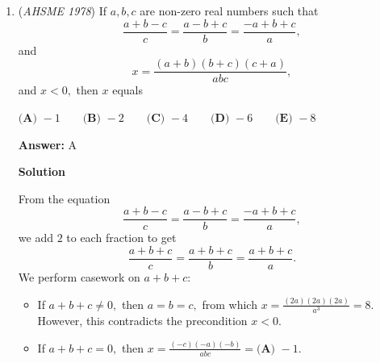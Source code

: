 \begin{enumerate}
 $\textbf{(A) }.05\qquad \textbf{(B) }.065\qquad \textbf{(C) }.08\qquad \textbf{(D) }.09\qquad  \textbf{(E) }.1$

 \textbf{Answer: }C



\textbf{Solution}

Let's say that we will have $3$ slips for every number not exceeding $100$ but bigger than $50.$ This is to account for the $3p$ probability part. Let's now say that we will only have one slip for each number below or equal to $50.$ The probability(or $p$) will then be $\frac{1}{200}.$ Now let's have all the squares under $50,$ which are $1,4,9,16,25,36,49.$ The probability for these are $\frac{7}{200}.$ The numbers above $50$ that are squares are $64,81,100.$ We then need to multiply the probability by $3$ so the probability of these are $\frac{9}{200}.$ The answer is $\frac{7}{200}+\frac{9}{200}=0.08\implies\boxed{\textbf{(C).}}$



	\item (\textit{AHSME 1978}) If $a,b,c$ are non-zero real numbers such that 
 \[\frac{a+b-c}{c}=\frac{a-b+c}{b}=\frac{-a+b+c}{a},\] and 
 \[x=\frac{(a+b)(b+c)(c+a)}{abc},\] and $x<0,$ then $x$ equals


 $\textbf{(A) }{-}1\qquad \textbf{(B) }{-}2\qquad \textbf{(C) }{-}4\qquad \textbf{(D) }{-}6\qquad  \textbf{(E) }{-}8$

 \textbf{Answer: }A



\textbf{Solution}

From the equation 
 \[\frac{a+b-c}{c}=\frac{a-b+c}{b}=\frac{-a+b+c}{a},\] we add $2$ to each fraction to get 
 \[\frac{a+b+c}{c}=\frac{a+b+c}{b}=\frac{a+b+c}{a}.\]We perform casework on $a+b+c:$

            \begin{itemize}
        \item If $a+b+c\neq0,$ then $a=b=c,$ from which $x=\frac{(2a)(2a)(2a)}{a^3}=8.$ However, this contradicts the precondition $x<0.$
            \end{itemize}
            
            \begin{itemize}
        \item If $a+b+c=0,$ then $x=\frac{(-c)(-a)(-b)}{abc}=\boxed{\textbf{(A) }{-}1}.$
            \end{itemize}
            



\end{enumerate}

